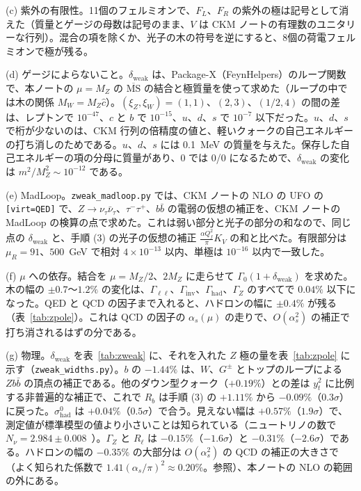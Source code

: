 \documentclass[a4paper,10pt]{ltjsarticle}
\newcommand{\MSbar}{\overline{\mathrm{MS}}}
\begin{document}
(c) 紫外の有限性。11個のフェルミオンで、$F_L$、$F_R$ の紫外の極は記号として消えた（質量とゲージの母数は記号のまま、$V$ は CKM ノートの有理数のユニタリーな行列）。混合の項を除くか、光子の木の符号を逆にすると、8個の荷電フェルミオンで極が残る。

(d) ゲージによらないこと。$\delta_{\mathrm{weak}}$ は、Package-X（FeynHelpers）のループ関数で、本ノートの $\mu=M_Z$ の $\MSbar$ の結合と極質量を使って求めた（ループの中では木の関係 $M_W=M_Z\hat c$）。$(\xi_Z,\xi_W)=(1,1)$、$(2,3)$、$(1/2,4)$ の間の差は、レプトンで $10^{-47}$、$c$ と $b$ で $10^{-15}$、$u$、$d$、$s$ で $10^{-7}$ 以下だった。$u$、$d$、$s$ で桁が少ないのは、CKM 行列の倍精度の値と、軽いクォークの自己エネルギーの打ち消しのためである。$u$、$d$、$s$ には 0.1~MeV の質量を与えた。保存した自己エネルギーの項の分母に質量があり、0 では 0/0 になるためで、$\delta_{\mathrm{weak}}$ の変化は $m^2/M_Z^2\sim10^{-12}$ である。

(e) MadLoop。\texttt{zweak\_madloop.py} では、CKM ノートの NLO の UFO の \texttt{[virt=QED]} で、$Z\to\nu_\tau\bar\nu_\tau$、$\tau^-\tau^+$、$b\bar b$ の電弱の仮想の補正を、CKM ノートの MadLoop の検算の点で求めた。これは弱い部分と光子の部分の和なので、同じ点の $\delta_{\mathrm{weak}}$ と、手順 (3) の光子の仮想の補正 $\frac{\alpha Q_f^2}\pi K_V$ の和と比べた。有限部分は $\mu_R=91$、$500$~GeV で相対 $4\times10^{-13}$ 以内、単極は $10^{-16}$ 以内で一致した。

(f) $\mu$ への依存。結合を $\mu=M_Z/2$、$2M_Z$ に走らせて $\Gamma_0(1+\delta_{\mathrm{weak}})$ を求めた。木の幅の $\pm0.7$〜$1.2\%$ の変化は、$\Gamma_{\ell\ell}$、$\Gamma_{\mathrm{inv}}$、$\Gamma_{\mathrm{had}}$、$\Gamma_Z$ のすべてで $0.04\%$ 以下になった。QED と QCD の因子まで入れると、ハドロンの幅に $\pm0.4\%$ が残る（表~\ref{tab:zpole}）。これは QCD の因子の $\alpha_s(\mu)$ の走りで、$O(\alpha_s^2)$ の補正で打ち消されるはずの分である。

(g) 物理。$\delta_{\mathrm{weak}}$ を表~\ref{tab:zweak} に、それを入れた $Z$ 極の量を表~\ref{tab:zpole} に示す（\texttt{zweak\_widths.py}）。$b$ の $-1.44\%$ は、$W$、$G^\pm$ とトップのループによる $Zb\bar b$ の頂点の補正である。他のダウン型クォーク（$+0.19\%$）との差は $y_t^2$ に比例する非普遍的な補正で、これで $R_b$ は手順 (3) の $+1.11\%$ から $-0.09\%$（$0.3\sigma$）に戻った。$\sigma^0_{\mathrm{had}}$ は $+0.04\%$（$0.5\sigma$）で合う。見えない幅は $+0.57\%$（$1.9\sigma$）で、測定値が標準模型の値より小さいことは知られている（ニュートリノの数で $N_\nu=2.984\pm0.008$~\cite{lepewwg06}）。$\Gamma_Z$ と $R_\ell$ は $-0.15\%$（$-1.6\sigma$）と $-0.31\%$（$-2.6\sigma$）である。ハドロンの幅の $-0.35\%$ の大部分は $O(\alpha_s^2)$ の QCD の補正の大きさで（よく知られた係数で $1.41(\alpha_s/\pi)^2\approx0.20\%$。参照）、本ノートの NLO の範囲の外にある。
\end{document}
